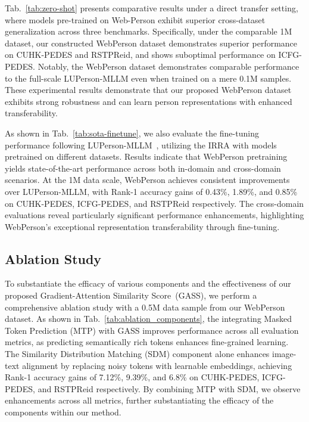 Tab.~\ref{tab:zero-shot} presents comparative results under a direct transfer setting, where models pre-trained on Web-Person exhibit superior cross-dataset generalization across three benchmarks. Specifically, under the comparable 1M dataset, our constructed WebPerson dataset demonstrates superior performance on CUHK-PEDES and RSTPReid, and shows suboptimal performance on ICFG-PEDES. Notably, the WebPerson dataset demonstrates comparable performance to the full-scale LUPerson-MLLM even when trained on a mere 0.1M samples. These experimental results demonstrate that our proposed WebPerson dataset exhibits strong robustness and can learn person representations with enhanced transferability.


As shown in Tab.~\ref{tab:sota-finetune}, we also evaluate the fine-tuning performance following LUPerson-MLLM~\cite{tan2024harnessing}, utilizing the IRRA with models pretrained on different datasets. Results indicate that WebPerson pretraining yields state-of-the-art performance across both in-domain and cross-domain scenarios. At the 1M data scale, WebPerson achieves consistent improvements over LUPerson-MLLM, with Rank-1 accuracy gains of 0.43\%, 1.89\%, and 0.85\% on CUHK-PEDES, ICFG-PEDES, and RSTPReid respectively. The cross-domain evaluations reveal particularly significant performance enhancements, highlighting WebPerson's exceptional representation transferability through fine-tuning.


\subsection{Ablation Study}


To substantiate the efficacy of various components and the effectiveness of our proposed Gradient-Attention Similarity Score~(GASS), we perform a comprehensive ablation study with a 0.5M data sample from our WebPerson dataset. As shown in Tab.~\ref{tab:ablation_components}, the integrating Masked Token Prediction (MTP) with GASS improves performance across all evaluation metrics, as predicting semantically rich tokens enhances fine-grained learning. The Similarity Distribution Matching (SDM) component alone enhances image-text alignment by replacing noisy tokens with learnable embeddings, achieving Rank-1 accuracy gains of 7.12\%, 9.39\%, and 6.8\% on CUHK-PEDES, ICFG-PEDES, and RSTPReid respectively. By combining MTP with SDM, we observe enhancements across all metrics, further substantiating the efficacy of the components within our method.

